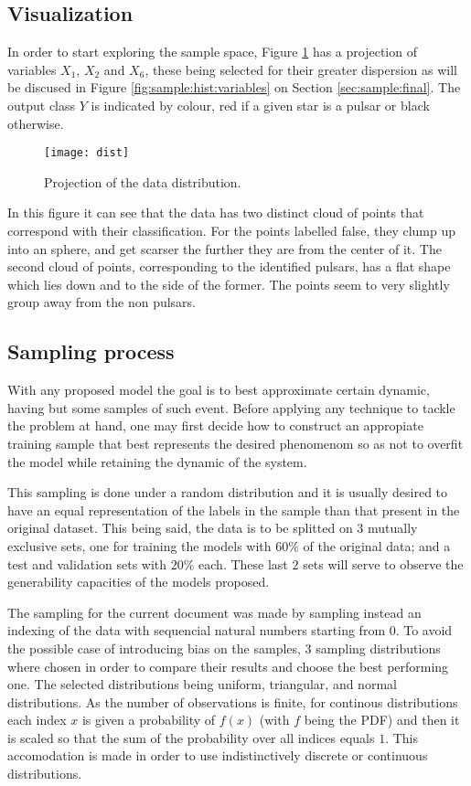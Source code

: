 \subsection{Visualization}

In order to start exploring the sample space, Figure \ref{fig:dist} has a
projection of variables $X_1$, $X_2$ and $X_6$, these being selected for their
greater dispersion as will be discused in Figure \ref{fig:sample:hist:variables}
on Section \ref{sec:sample:final}. The output class $Y$ is indicated by
colour, red if a given star is a pulsar or black otherwise. 

\begin{figure}[ht]
    \texttt{[image: dist]}
    \caption{Projection of the data distribution. \label{fig:dist}}
\end{figure}

In this figure it can see that the data has two distinct cloud of points that
correspond with their classification. For the points labelled false, they clump
up into an sphere, and get scarser the further they are from the center of it.
The second cloud of points, corresponding to the identified pulsars, has a flat
shape which lies down and to the side of the former. The points seem to very
slightly group away from the non pulsars.

\subsection{Sampling process\label{sec:sample}}

With any proposed model the goal is to best approximate certain dynamic, having
but some samples of such event. Before applying any technique to tackle the
problem at hand, one may first decide how to construct an appropiate training
sample that best represents the desired phenomenom so as not to overfit the
model while retaining the dynamic of the system.

This sampling is done under a random distribution and it is usually desired to
have an equal representation of the labels in the sample than that present in
the original dataset. This being said, the data is to be splitted on $3$
mutually exclusive sets, one for training the models with $60\%$ of the original
data; and a test and validation sets with $20\%$ each. These last $2$ sets will
serve to observe the generability capacities of the models proposed.

The sampling for the current document was made by sampling instead an indexing
of the data with sequencial natural numbers starting from 0. To avoid the
possible case of introducing bias on the samples, $3$ sampling distributions
where chosen in order to compare their results and choose the best performing
one. The selected distributions being uniform, triangular, and normal
distributions. As the number of observations is finite, for continous
distributions each index $x$ is given a probability of $f(x)$ (with $f$ being
the PDF) and then it is scaled so that the sum of the probability over all
indices equals $1$. This accomodation is made in order to use indistinctively
discrete or continuous distributions.

